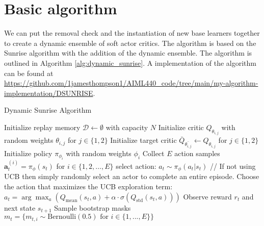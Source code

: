 \section{Basic algorithm}

We can put the removal check and the instantiation of new base learners together to create a dynamic ensemble of soft actor critics. The algorithm is based on the Sunrise algorithm \cite{leeSUNRISESimpleUnified2021} with the addition of the dynamic ensemble. The algorithm is outlined in Algorithm \ref{alg:dynamic_sunrise}. A implementation of the algorithm can be found at \url{https://github.com/1jamesthompson1/AIML440_code/tree/main/my-algorithm-implementation/DSUNRISE}.

\begin{algorithm}
\caption{Dynamic Sunrise Algorithm}
\label{alg:dynamic_sunrise}
\begin{algorithmic}[1]
\State Initialize replay memory $\mathcal{D} \leftarrow \emptyset$ with capacity $N$
    \State Initialize critic $Q_{\theta_{i,j}}$ with random weights $\theta_{i,j}$ for $j \in \{1,2\}$
    \State Initialize target critic $\bar{Q}_{\bar{\theta_{i,j}}} \leftarrow Q_{\theta_{i,j}}$ for $j \in \{1,2\}$
    \State Initialize policy $\pi_{\phi_i}$ with random weights $\phi_i$
\EndFor
\Repeat
        \State Collect $E$ action samples $\bm{a}_{t}^{(i)} = \pi_{\phi}(s_{t})$ for $i \in \{1,2,\ldots,E\}$
        \State select action: $a_{t} \sim \pi_{\phi}(a_{t} | s_{t})$
        \State // If not using UCB then simply randomly select an actor to complete an entire episode.
        \State Choose the action that maximizes the UCB exploration term:
        \State $a_{t} = \arg\max_{a} \left( Q_{\text{mean}}(s_{t}, a) + \alpha \cdot \sigma(Q_{\text{std}}(s_{t}, a)) \right)$
        \State Observe reward $r_{t}$ and next state $s_{t+1}$
        \State Sample bootstrap masks $m_{t} = \{m_{t,i} \sim \text{Bernoulli}(0.5) \text{ for } i \in \{1,..., E\}\}$

\end{algorithmic}
\end{algorithm}
